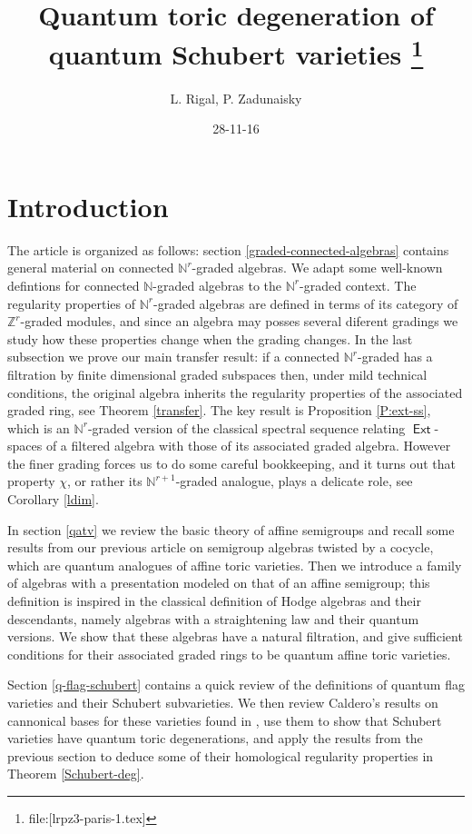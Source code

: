 \documentclass[11pt,fleqn]{article}
\title{
Quantum toric degeneration of quantum Schubert varieties
\footnote{file:[lrpz3-paris-1.tex]}
}
\date{28-11-16}
\author{L. Rigal, P. Zadunaisky}
\newcommand\NN{\mathbb N}
\newcommand\ZZ{\mathbb Z}
\DeclareMathOperator\Ext{\mathsf{Ext}}
\begin{document}
\maketitle


\section{Introduction}

The article is organized as follows: section \ref{graded-connected-algebras} 
contains general material on connected $\NN^r$-graded algebras. We adapt some 
well-known defintions for connected $\NN$-graded algebras to the 
$\NN^r$-graded context. The regularity properties of $\NN^r$-graded algebras 
are defined in terms of its category of $\ZZ^r$-graded modules, and since an 
algebra may posses several diferent gradings we study how these properties 
change when the grading changes. In the last subsection we 
prove our main transfer result: if a connected $\NN^r$-graded has a filtration 
by finite dimensional graded subspaces then, under mild technical conditions, 
the original algebra inherits the regularity properties of the associated 
graded ring, see Theorem \ref{transfer}. The key result is Proposition 
\ref{P:ext-ss}, which is an $\NN^r$-graded version of the classical spectral 
sequence relating $\Ext$-spaces of a filtered algebra with those of its 
associated graded algebra. However the finer grading forces us 
to do some careful bookkeeping, and it turns out that property $\chi$, or 
rather its $\NN^{r+1}$-graded analogue, plays a delicate role, see Corollary 
\ref{ldim}.

In section \ref{qatv} we review the basic theory of affine semigroups and 
recall some results from our previous article \cite{RZ2} on semigroup algebras 
twisted by a cocycle, which are quantum analogues of affine toric varieties. 
Then we introduce a family of algebras with a presentation modeled on that of 
an affine semigroup; this definition is inspired in the classical definition 
of Hodge algebras and their descendants, namely algebras with a straightening 
law and their quantum versions. We show that these algebras have a natural 
filtration, and give  sufficient conditions for their associated graded rings 
to be quantum affine toric varieties.

Section \ref{q-flag-schubert} contains a quick review of the definitions of 
quantum flag varieties and their Schubert subvarieties. We then review 
Caldero's results on cannonical bases for these varieties found in \cite{C}, 
use them to show that Schubert varieties have quantum toric degenerations, and 
apply the results from the previous section to deduce some of their 
homological regularity properties in Theorem \ref{Schubert-deg}. 
\end{document}
